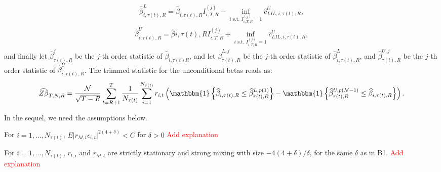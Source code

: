 \begin{align}
\widehat{\beta}_{i, \tau(t), R}^L = \widehat{\beta}_{i, \tau(t), R} I^{(j)}_{i,T,R} - \inf_{i \text{ s.t. } I^{(j)}_{i,T,R}=1} \widehat{c}_{LIL, i, \tau(t), R}^U,
\end{align}
\begin{align}
\widehat{\beta}_{i, \tau(t), R}^U = \widehat{\beta}{i, \tau(t), R} I^{(j)}_{i,T,R} + \inf_{i \text{ s.t. } I^{(j)}_{i,T,R}=1} \widehat{c}_{LIL, i, \tau(t), R}^U,
\end{align}
and finally let $\widehat{\beta}_{\tau(t), R}^j$ be the $j$-th order statistic of $\widehat{\beta}_{i, \tau(t) R}$, and let $\widehat{\beta}_{\tau(t), R}^{L,j}$ be the $j$-th order statistic of $\widehat{\beta}_{i, \tau(t), R}^L$, and $\widehat{\beta}_{\tau(t), R}^{U,j}$ be the $j$-th order statistic of $\widehat{\beta}_{i, \tau(t), R}^U$. The trimmed statistic for the unconditional betas reads as:
\begin{align}
\widehat{Z \beta}_{T,N,R} = \frac{\mathcal{N}}{\sqrt{T - R}} \sum_{t=R+1}^{T} \frac{1}{N_{\tau(t)}} \sum_{i=1}^{N_{\tau(t)}} r_{i,t} \left(\mathbbm{1} \left\{ \widehat{\beta}_{i, \tau(t), R} \leq \widehat{\beta}_{\tau(t), R}^{L,p(1)} \right\} - \mathbbm{1} \left\{ \widehat{\beta}_{\tau(t), R}^{U, p(\mathcal{N}-1)} \leq \widehat{\beta}_{i, \tau(t), R} \right\} \right).
\end{align}

In the sequel, we need the assumptions below.
\begin{assumption}
\label{ass:b1}
For $i = 1, ..., N_{\tau(t)}$, $E \vert r_{M,t}\epsilon_{i,t} \vert^{2(4+\delta)} < C$ for $\delta > 0$ \textcolor{red}{Add explanation}
\end{assumption}
\begin{assumption}
\label{ass:b2}
For $i = 1, ..., N_{\tau(t)}$, $r_{t,i}$ and $r_{M,t}$ are strictly stationary and strong mixing with size $-4(4 + \delta) / \delta$, for the same $\delta$ as in B1. \textcolor{red}{Add explanation}
\end{assumption}

